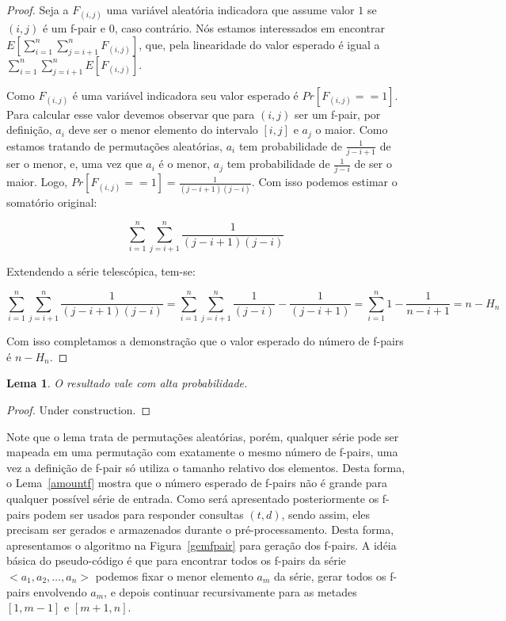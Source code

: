 \documentclass[12pt]{article}
\newtheorem{lem}[thm]{Lema}
\begin{document}
\begin{proof}
Seja a $F_{(i, j)}$ uma variável aleatória indicadora que assume valor
$1$ se $(i, j)$ é um f-pair e $0$, caso contrário. Nós estamos interessados
em encontrar $E[\sum_{i = 1}^n \sum_{j=i + 1}^n F_{(i, j)}]$, que, pela linearidade
do valor esperado é igual a $\sum_{i = 1}^n \sum_{j = i + 1}^n E[F_{(i, j)}]$.  

Como $F_{(i, j)}$ é uma variável indicadora seu valor esperado é $Pr[F_{(i,j)} == 1]$.
Para calcular esse valor devemos observar que para $(i, j)$ ser um f-pair, por definição,
$a_i$ deve ser o menor elemento do intervalo $[i, j]$ e $a_j$ o maior. Como estamos
tratando de permutações aleatórias, $a_i$ tem probabilidade de $\frac{1}{j - i + 1}$ de
ser o menor, e, uma vez que $a_i$ é o menor, $a_j$ tem probabilidade de $\frac{1}{j - i}$ de
ser o maior. Logo, $Pr[F_{(i, j)} == 1] = \frac{1}{(j - i + 1) (j - i)}$. Com isso podemos
estimar o somatório original:

$$\sum_{i = 1}^n \sum_{j = i + 1}^n  \frac{1}{(j - i + 1) (j - i)}$$

Extendendo a série telescópica, tem-se:

$$\sum_{i = 1}^n \sum_{j = i + 1}^n  \frac{1}{(j - i + 1) (j - i)} = \sum_{i = 1}^n \sum_{j = i + 1}^n  \frac{1}{(j - i)} - \frac{1}{(j - i + 1)} = \sum_{i = 1}^n 1 - \frac{1}{n - i + 1} = n - H_n $$

Com isso completamos a demonstração que o valor esperado do número de f-pairs é $n - H_n$.
\end{proof}

\begin{lem}
O resultado vale com alta probabilidade.
\end{lem}

\begin{proof}
Under construction.
\end{proof}

Note que o lema trata de permutações aleatórias, porém, qualquer série
pode ser mapeada em uma permutação com exatamente o mesmo número de f-pairs,
uma vez a definição de f-pair só utiliza o tamanho relativo dos elementos.
Desta forma, o Lema~\ref{amountf} mostra que o número esperado de f-pairs não é grande
para qualquer possível série de entrada. Como será apresentado posteriormente os f-pairs podem ser usados para responder
consultas $(t, d)$, sendo assim, eles precisam ser gerados e armazenados
durante o pré-processamento. Desta forma, apresentamos o algoritmo na Figura~\ref{gemfpair} para geração
dos f-pairs. A idéia básica do pseudo-código é que para encontrar todos os f-pairs da
série $<a_1, a_2, \ldots, a_n>$ podemos fixar o menor elemento $a_m$ da série,
gerar todos os f-pairs envolvendo $a_m$, e depois continuar recursivamente para as metades $[1, m - 1]$ e $[m + 1, n]$.
\end{document}
